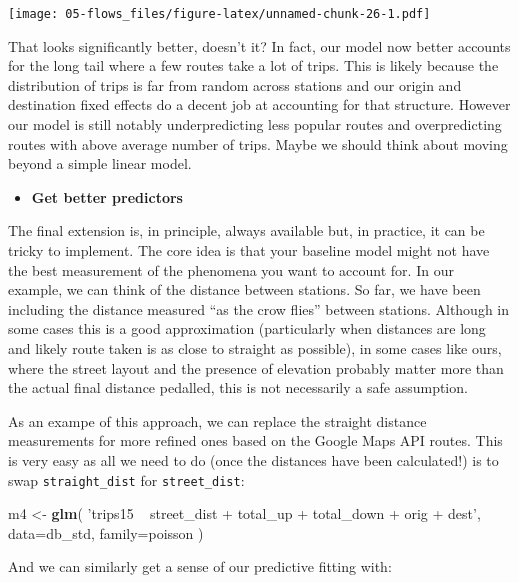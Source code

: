 \documentclass[
]{book}
\newenvironment{Shaded}{\begin{snugshade}}{\end{snugshade}}
\newcommand{\DataTypeTok}[1]{\textcolor[rgb]{0.13,0.29,0.53}{#1}}
\newcommand{\KeywordTok}[1]{\textcolor[rgb]{0.13,0.29,0.53}{\textbf{#1}}}
\newcommand{\NormalTok}[1]{#1}
\newcommand{\StringTok}[1]{\textcolor[rgb]{0.31,0.60,0.02}{#1}}
\providecommand{\tightlist}{%
  \setlength{\itemsep}{0pt}\setlength{\parskip}{0pt}}
\begin{document}
\texttt{[image: 05-flows\_files/figure-latex/unnamed-chunk-26-1.pdf]}

That looks significantly better, doesn't it? In fact, our model now better accounts for the long tail where a few routes take a lot of trips. This is likely because the distribution of trips is far from random across stations and our origin and destination fixed effects do a decent job at accounting for that structure. However our model is still notably underpredicting less popular routes and overpredicting routes with above average number of trips. Maybe we should think about moving beyond a simple linear model.

\begin{itemize}
\tightlist
\item
  \textbf{Get better predictors}
\end{itemize}

The final extension is, in principle, always available but, in practice, it can be tricky to implement. The core idea is that your baseline model might not have the best measurement of the phenomena you want to account for. In our example, we can think of the distance between stations. So far, we have been including the distance measured ``as the crow flies'' between stations. Although in some cases this is a good approximation (particularly when distances are long and likely route taken is as close to straight as possible), in some cases like ours, where the street layout and the presence of elevation probably matter more than the actual final distance pedalled, this is not necessarily a safe assumption.

As an exampe of this approach, we can replace the straight distance measurements for more refined ones based on the Google Maps API routes. This is very easy as all we need to do (once the distances have been calculated!) is to swap \texttt{straight\_dist} for \texttt{street\_dist}:

\begin{Shaded}
\begin{Highlighting}[]
\NormalTok{m4 <-}\StringTok{ }\KeywordTok{glm}\NormalTok{(}
  \StringTok{'trips15 ~ street_dist + total_up + total_down + orig + dest'}\NormalTok{, }
  \DataTypeTok{data=}\NormalTok{db_std,}
  \DataTypeTok{family=}\NormalTok{poisson}
\NormalTok{)}
\end{Highlighting}
\end{Shaded}

And we can similarly get a sense of our predictive fitting with:
\end{document}

